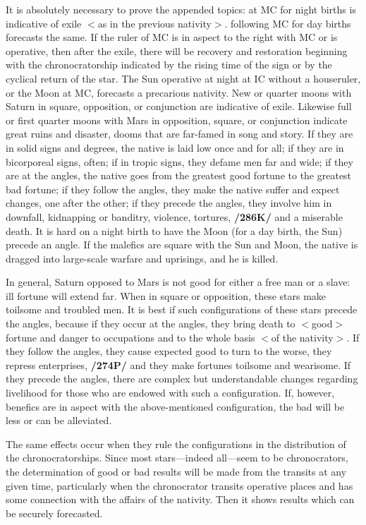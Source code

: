 It is absolutely necessary to prove the appended topics: \Saturn\xspace at MC for night births is indicative of exile $<$as in the previous nativity$>$. \Mars\xspace following MC for day births forecasts the same. If the ruler of MC is in aspect to the right with MC or is operative, then after the exile, there will be recovery and
restoration beginning with the chronocratorship indicated by the rising time of the sign or by the cyclical return of the star. The Sun operative at night at IC without a houseruler, or the Moon at MC, forecasts a precarious nativity. New or quarter moons with Saturn in square, opposition, or conjunction are indicative of exile. Likewise full or first quarter moons with Mars in opposition, square, or conjunction indicate great ruins and disaster, dooms that are far-famed in song and story. If they are in solid signs and degrees, the native is laid low once and for all; if they are in bicorporeal signs, often; if in tropic signs, they defame men far and wide; if they are at the angles, the native goes from the greatest good fortune to the greatest bad fortune; if they follow the angles, they make the native suffer and expect changes, one after the other; if they precede the angles, they involve him in downfall, kidnapping or banditry, violence, tortures, \textbf{/286K/} and a miserable death. It is hard on a night birth to have the Moon (for a day birth, the Sun) precede an angle. If the malefics are square with the Sun and Moon, the native is dragged into large-scale warfare and uprisings, and he is killed.

In \mndl general, Saturn opposed to Mars is not good for either a free man or a slave: ill fortune will extend far. When in square or opposition, these stars make toilsome and troubled men. It is best if such configurations of these stars precede the angles, because if they occur at the angles, they bring death to $<$good$>$ fortune and danger to occupations and to the whole basis $<$of the nativity$>$. If they follow the angles, they cause expected good to turn to the worse, they repress enterprises, \textbf{/274P/} and they make fortunes toilsome and wearisome. If they precede the angles, there are complex but understandable changes regarding livelihood for those who are endowed with such a configuration. If, however, benefics are in aspect with the above-mentioned configuration, the bad will be less or can be alleviated.

The \mnt same effects occur when they rule the configurations in the distribution of the chronocratorships. Since most stars—indeed all—seem to be chronocrators, the determination of good or bad results will be made from the transits at any given time, particularly when the chronocrator transits operative places and has some connection with the affairs of the nativity. Then it shows results which can be securely
forecasted.

